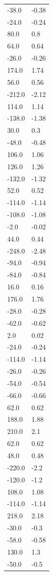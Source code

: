 \begin{longtable}{ll}
-38.0 & -0.38 \\
-24.0 & -0.24 \\
80.0 & 0.8 \\
64.0 & 0.64 \\
-26.0 & -0.26 \\
174.0 & 1.74 \\
56.0 & 0.56 \\
-212.0 & -2.12 \\
114.0 & 1.14 \\
-138.0 & -1.38 \\
30.0 & 0.3 \\
-48.0 & -0.48 \\
106.0 & 1.06 \\
126.0 & 1.26 \\
-132.0 & -1.32 \\
52.0 & 0.52 \\
-114.0 & -1.14 \\
-108.0 & -1.08 \\
-2.0 & -0.02 \\
44.0 & 0.44 \\
-248.0 & -2.48 \\
-94.0 & -0.94 \\
-84.0 & -0.84 \\
16.0 & 0.16 \\
176.0 & 1.76 \\
-28.0 & -0.28 \\
-62.0 & -0.62 \\
2.0 & 0.02 \\
-24.0 & -0.24 \\
-114.0 & -1.14 \\
-26.0 & -0.26 \\
-54.0 & -0.54 \\
-66.0 & -0.66 \\
62.0 & 0.62 \\
188.0 & 1.88 \\
210.0 & 2.1 \\
62.0 & 0.62 \\
48.0 & 0.48 \\
-220.0 & -2.2 \\
-120.0 & -1.2 \\
108.0 & 1.08 \\
-114.0 & -1.14 \\
218.0 & 2.18 \\
-30.0 & -0.3 \\
-58.0 & -0.58 \\
130.0 & 1.3 \\
-50.0 & -0.5 \\

\end{longtable}
